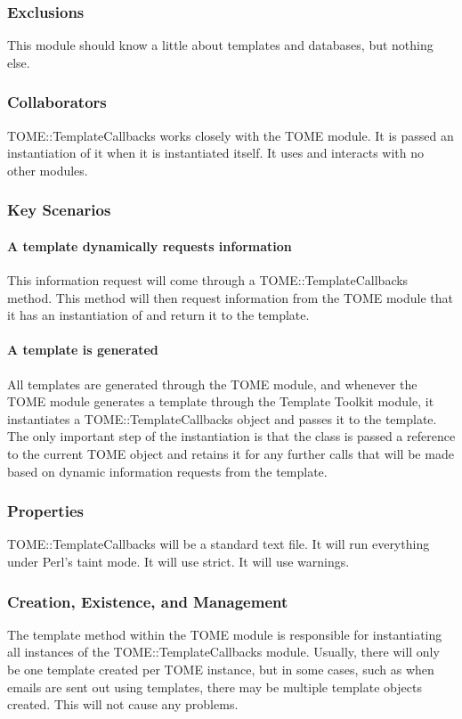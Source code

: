 \documentclass[12pt,titlepage]{article}
\begin{document}
\subsubsection{Exclusions}
This module should know a little about templates and databases, but nothing else.
\subsubsection{Collaborators}
TOME::TemplateCallbacks works closely with the TOME module.  It is passed an instantiation of it when it is instantiated itself.  It uses and interacts with no other modules.
\subsubsection{Key Scenarios}
\paragraph{A template dynamically requests information}
This information request will come through a TOME::TemplateCallbacks method.  This method will then request information from the TOME module that it has an instantiation of and return it to the template.
\paragraph{A template is generated}
All templates are generated through the TOME module, and whenever the TOME module generates a template through the Template Toolkit module, it instantiates a TOME::TemplateCallbacks object and passes it to the template.  The only important step of the instantiation is that the class is passed a reference to the current TOME object and retains it for any further calls that will be made based on dynamic information requests from the template.
\subsubsection{Properties}
TOME::TemplateCallbacks will be a standard text file.  It will run everything under Perl's taint mode.  It will use strict.  It will use warnings. 
\subsubsection{Creation, Existence, and Management}
The template method within the TOME module is responsible for instantiating all instances of the TOME::TemplateCallbacks module.  Usually, there will only be one template created per TOME instance, but in some cases, such as when emails are sent out using templates, there may be multiple template objects created.  This will not cause any problems.
\end{document}
